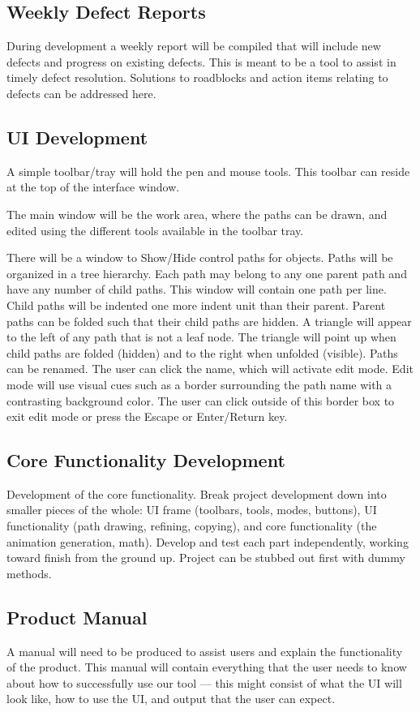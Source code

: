 \documentclass[12pt]{article}
\begin{document}
\subsection{Weekly Defect Reports}
During development a weekly report will be compiled that will include new defects and progress on existing defects. This is meant to be a tool to assist in timely defect resolution. Solutions to roadblocks and action items relating to defects can be addressed here.

\subsection{UI Development}
A simple toolbar/tray will hold the pen and mouse tools. This toolbar can reside at the top of the interface window.

The main window will be the work area, where the paths can be drawn, and edited using the different tools available in the toolbar tray.

There will be a window to Show/Hide control paths for objects. Paths will be organized in a tree hierarchy. Each path may belong to any one parent path and have any number of child paths. This window will contain one path per line. Child paths will be indented one more indent unit than their parent. Parent paths can be folded such that their child paths are hidden. A triangle will appear to the left of any path that is not a leaf node. The triangle will point up when child paths are folded (hidden) and to the right when unfolded (visible). Paths can be renamed. The user can click the name, which will activate edit mode. Edit mode will use visual cues such as a border surrounding the path name with a contrasting background color. The user can click outside of this border box to exit edit mode or press the Escape or Enter/Return key.

\subsection{Core Functionality Development}
Development of the core functionality. Break project development down into smaller pieces of the whole: UI frame (toolbars, tools, modes, buttons), UI functionality (path drawing, refining, copying), and core functionality (the animation generation, math). Develop and test each part independently, working toward finish from the ground up. Project can be stubbed out first with dummy methods.

\subsection{Product Manual}
A manual will need to be produced to assist users and explain the functionality of the product. This manual will contain everything that the user needs to know about how to successfully use our tool --- this might consist of what the UI will look like, how to use the UI, and output that the user can expect. 
\end{document}
